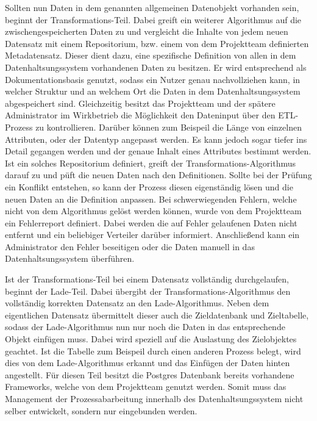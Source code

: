 Sollten nun Daten in dem genannten allgemeinen Datenobjekt vorhanden sein,
beginnt der Transformations-Teil. Dabei greift ein weiterer Algorithmus auf
die zwischengespeicherten Daten zu und vergleicht die Inhalte von jedem neuen
Datensatz mit einem \gls{Repositorium}, bzw. einem von dem Projektteam
definierten Metadatensatz. Dieser dient dazu, eine spezifische Definition von
allen in dem Datenhaltsungssystem vorhandenen Daten zu besitzen. Er wird
entsprechend als Dokumentationsbasis genutzt, sodass ein Nutzer genau
nachvollziehen kann, in welcher Struktur und an welchem Ort die Daten in dem
Datenhaltsungssystem abgespeichert sind. Gleichzeitig besitzt das Projektteam
und der spätere Administrator im Wirkbetrieb die Möglichkeit den Dateninput
über den ETL-Prozess zu kontrollieren. Darüber können zum Beispeil die Länge
von einzelnen Attributen, oder der Datentyp angepasst werden. Es kann jedoch
sogar tiefer ins Detail gegangen werden und der genaue Inhalt eines Attributes
bestimmt werden. Ist ein solches \gls{Repositorium} definiert, greift der
Transformations-Algorithmus darauf zu und püft die neuen Daten nach den
Definitionen. Sollte bei der Prüfung ein Konflikt entstehen, so kann der
Prozess diesen eigenständig lösen und die neuen Daten an die Definition
anpassen. Bei schwerwiegenden Fehlern, welche nicht von dem Algorithmus
gelöst werden können, wurde von dem Projektteam ein Fehlerreport definiert.
Dabei werden die auf Fehler gelaufenen Daten nicht entfernt und ein
beliebiger Verteiler darüber informiert. Anschließend kann ein Administrator
den Fehler beseitigen oder die Daten manuell in das Datenhaltsungssystem
überführen.

Ist der Transformations-Teil bei einem Datensatz vollständig durchgelaufen,
beginnt der Lade-Teil. Dabei übergibt der Transformations-Algorithmus den
vollständig korrekten Datensatz an den Lade-Algorithmus. Neben dem eigentlichen
Datensatz übermittelt dieser auch die Zieldatenbank und Zieltabelle, sodass
der Lade-Algorithmus nun nur noch die Daten in das entsprechende Objekt
einfügen muss. Dabei wird speziell auf die Auslastung des Zielobjektes
geachtet. Ist die Tabelle zum Beispeil durch einen anderen Prozess belegt,
wird dies von dem Lade-Algorithmus erkannt und das Einfügen der Daten
hinten angestellt. Für diesen Teil besitzt die Postgres Datenbank bereits
vorhandene Frameworks, welche von dem Projektteam genutzt werden. Somit muss
das Management der Prozessabarbeitung innerhalb des Datenhaltsungssystem nicht
selber entwickelt, sondern nur eingebunden werden. 
\nl%

